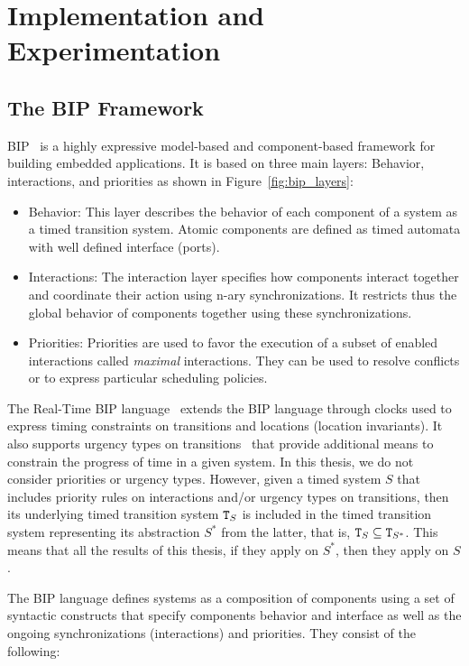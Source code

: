 \chapter{Implementation and Experimentation}
\label{chap:7}
\minitoc
\section{The BIP Framework}

BIP~\cite{intro:bip} is a highly expressive model-based and component-based framework for 
building embedded applications. It is based on three main layers: Behavior, interactions, and
priorities as shown in Figure~\ref{fig:bip_layers}:

\begin{itemize}
  \item Behavior: This layer describes the behavior of each component of a system as a timed
    transition system. Atomic components are defined as timed automata with well defined 
    interface (ports).
  \item Interactions: The interaction layer specifies how components interact together and
    coordinate their action using n-ary synchronizations. It restricts thus the global behavior 
    of components together using these synchronizations.
  \item Priorities: Priorities are used to favor the execution of a subset of enabled 
    interactions called \emph{maximal} interactions. They can be used to resolve conflicts or to
    express particular scheduling policies.
\end{itemize}

The Real-Time BIP language~\cite{rtbip} extends the BIP language through clocks used to express
timing constraints on transitions and locations (location invariants). 
It also supports urgency types on transitions~\cite{urg} that provide additional means to 
constrain the progress of time in a given system.
In this thesis, we do not consider priorities or urgency types. However, given a timed system
$S$ that includes priority rules on interactions and/or urgency types on transitions, 
then its underlying timed transition system $\texttt{T}_S$ is included in the timed
transition system representing its abstraction $S^*$ from the latter, that is,
$\texttt{T}_S\subseteq\texttt{T}_{S^*}$. This means that all the results of this thesis, if they apply
on $S^*$, then they apply on $S$.

The BIP language defines systems as a composition of components using a set of syntactic
constructs that specify components behavior and interface as well as the ongoing 
synchronizations (interactions) and priorities. They consist of the following:

